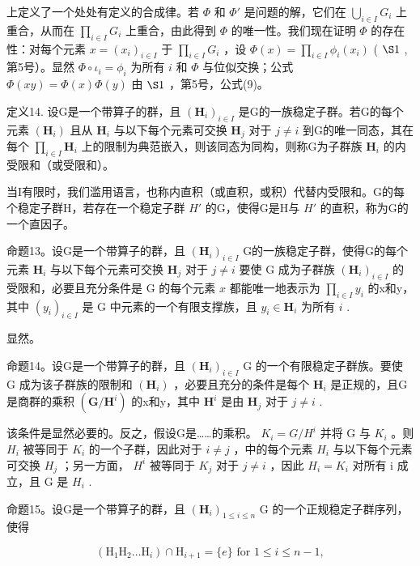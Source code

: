 上定义了一个处处有定义的合成律。若 \(\Phi\) 和 \(\Phi'\) 是问题的解，它们在 \(\bigcup_{i\in I}G_i\) 上重合，从而在 \(\prod_{i\in I}G_i\) 上重合，由此得到 \(\Phi\) 的唯一性。我们现在证明 \(\Phi\) 的存在性：对每个元素 \(x = (x_i)_{i\in I}\) 于 \(\prod_{i\in I}G_i\) ，设 \(\Phi(x) = \prod_{i\in I}\phi_i(x_i)\) ( \(\S 1\) , 第5号）。显然 \(\Phi \circ \iota_i = \phi_i\) 为所有 \(i\) 和 \(\Phi\) 与位似交换；公式 \(\Phi(xy) = \Phi(x)\Phi(y)\) 由 \(\S 1\) ，第5号，公式(9)。

定义14. 设G是一个带算子的群，且 \((\mathbf{H}_i)_{i\in I}\) 是G的一族稳定子群。若G的每个元素 \((\mathbf{H}_i)\) 且从 \(\mathbf{H}_i\) 与以下每个元素可交换 \(\mathbf{H}_j\) 对于 \(j\neq i\) 到G的唯一同态，其在每个 \(\prod_{i\in I}\mathbf{H}_i\) 上的限制为典范嵌入，则该同态为同构，则称G为子群族 \(\mathbf{H}_i\) 的内受限和（或受限和）。

当I有限时，我们滥用语言，也称内直积（或直积，或积）代替内受限和。G的每个稳定子群H，若存在一个稳定子群 \(H'\) 的G，使得G是H与 \(H'\) 的直积，称为G的一个直因子。

命题13。设G是一个带算子的群，且 \((\mathbf{H}_i)_{i\in I}\) G的一族稳定子群，使得G的每个元素 \(\mathbf{H}_i\) 与以下每个元素可交换 \(\mathbf{H}_j\) 对于 \(j\neq i\) 要使 G 成为子群族 \((\mathbf{H}_i)_{i\in I}\) 的受限和，必要且充分条件是 G 的每个元素 \(x\) 都能唯一地表示为 \(\prod_{i\in I}y_i\) 的x和y，其中 \((y_i)_{i\in I}\) 是 G 中元素的一个有限支撑族，且 \(y_i\in \mathbf{H}_i\) 为所有 \(i\) .

显然。

命题14。设G是一个带算子的群，且 \((\mathbf{H}_i)_{i\in I}\) G 的一个有限稳定子群族。要使 G 成为该子群族的限制和 \((\mathbf{H}_i)\) ，必要且充分的条件是每个 \(\mathbf{H}_i\) 是正规的，且G是商群的乘积 \((\mathbf{G} / \mathbf{H}^i)\) 的x和y，其中 \(\mathbf{H}^i\) 是由 \(\mathbf{H}_j\) 对于 \(j\neq i\) .

该条件是显然必要的。反之，假设G是……的乘积。 \(K_{i} = G/H^{i}\) 并将 G 与 \(K_{i}\) 。则 \(H_{i}\) 被等同于 \(K_{i}\) 的一个子群，因此对于 \(i \neq j\) ，中的每个元素 \(H_{i}\) 与以下每个元素可交换 \(H_{j}\) ；另一方面， \(H^{i}\) 被等同于 \(K_{j}\) 对于 \(j \neq i\) ，因此 \(H_{i} = K_{i}\) 对所有 i 成立，且 G 是 \(H_{i}\) .

命题15。设G是一个带算子的群，且 \((\mathbf{H}_i)_{1\leqslant i\leqslant n}\) G 的一个正规稳定子群序列，使得

\[
\left(\mathrm{H} _ {1} \mathrm{H} _ {2} \dots \mathrm{H} _ {i}\right) \cap \mathrm{H} _ {i + 1} = \{e \} \text { for } 1 \leqslant i \leqslant n - 1,
\]

